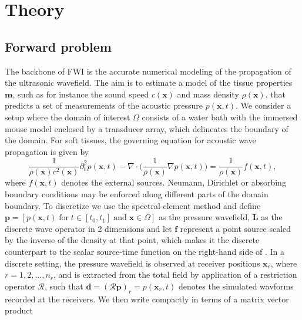 \documentclass[12pt]{iopart}
\begin{document}
\section{Theory}
\label{sec:theory}
\subsection{Forward problem}
The backbone of FWI is the accurate numerical modeling of the propagation of the ultrasonic wavefield. The aim is to estimate a model of the tissue properties $\mathbf{m}$, such as for instance the sound speed $c(\mathbf{x})$ and mass density $\rho(\mathbf{x})$, that predicts a set of measurements of the acoustic pressure $p(\mathbf{x},t)$. We consider a setup where the domain of interest $\Omega$ consists of a water bath with the immersed mouse model enclosed by a transducer array, which delineates the boundary of the domain. For soft tissues, the governing equation for acoustic wave propagation is given by 
\begin{equation}
 \frac{1}{\rho(\mathbf{x}) c^2(\mathbf{x})}\partial_t^2p(\mathbf{x},t)-\nabla\cdot\bigg(\frac{1}{\rho(\mathbf{x})}\nabla p(\mathbf{x},t)\bigg)=\frac{1}{\rho(\mathbf{x})}f(\mathbf{x},t),
 \label{eq:wave_equation_time_domain}
\end{equation}
where $f(\mathbf{x},t)$ denotes the external sources. Neumann, Dirichlet or absorbing boundary conditions may be enforced along different parts of the domain boundary. To discretize  we use the spectral-element method \cite{Salvus} and define $\mathbf{p}=[p(\mathbf{x},t)\;\mbox{for}\;t\in[t_0,t_1]\;\mbox{and}\;\mathbf{x} \in \Omega]$ as the pressure wavefield, $\mathbf{L}$ as the discrete wave operator in 2 dimensions and let $\mathbf{f}$ represent a point source scaled by the inverse of the density at that point, which makes it the discrete counterpart to the scalar source-time function on the right-hand side of . In a discrete setting, the pressure wavefield is observed at receiver positions $\mathbf{x}_r$, where $r=1,2,...,n_r$, and is extracted from the total field by application of a restriction operator $\mathcal{R}$, such that $\mathbf{d}=(\mathcal{R}\mathbf{p})_r=p(\mathbf{x}_r,t)$ denotes the simulated wavforms recorded at the receivers. We then write  compactly in terms of a matrix vector product 
\end{document}
